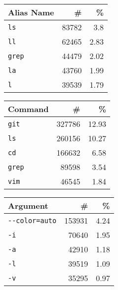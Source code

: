 \begin{table*}[t]
    \caption{Top alias names, commands and arguments}
    \label{tab:top-summary}
    \begin{tabular}{lrr}
    \toprule
       Alias Name &           \# &          \% \\
    \midrule
        \verb|ls| &  \num{83782} &   \num{3.8} \\
        \verb|ll| &  \num{62465} &  \num{2.83} \\
      \verb|grep| &  \num{44479} &  \num{2.02} \\
        \verb|la| &  \num{43760} &  \num{1.99} \\
         \verb|l| &  \num{39539} &  \num{1.79} \\
    \bottomrule
    \end{tabular}
    \hspace{0.3cm}
    \begin{tabular}{lrr}
        \toprule
               Command &            \# &           \% \\
        \midrule
            \verb|git| &  \num{327786} &  \num{12.93} \\
             \verb|ls| &  \num{260156} &  \num{10.27} \\
             \verb|cd| &  \num{166632} &   \num{6.58} \\
           \verb|grep| &   \num{89598} &   \num{3.54} \\
            \verb|vim| &   \num{46545} &   \num{1.84} \\
        \bottomrule
    \end{tabular}
    \hspace{0.3cm}
    \begin{tabular}{lrr}
        \toprule
                    Argument &            \# &          \% \\
        \midrule
         \verb|--color=auto| &  \num{153931} &  \num{4.24} \\
                   \verb|-i| &   \num{70640} &  \num{1.95} \\
                   \verb|-a| &   \num{42910} &  \num{1.18} \\
                   \verb|-l| &   \num{39519} &  \num{1.09} \\
                   \verb|-v| &   \num{35295} &  \num{0.97} \\
        \bottomrule
    \end{tabular}
\end{table*}

